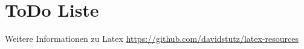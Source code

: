 \chapter{ToDo Liste}


Weitere Informationen zu Latex
\url{https://github.com/davidstutz/latex-resources}